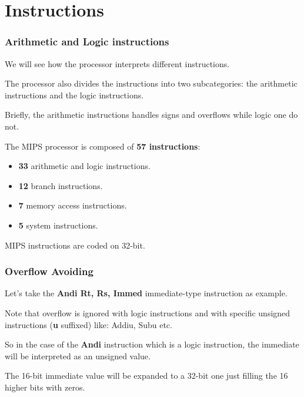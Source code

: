 %
%

\section{Instructions}


\begin{frame}
  \frametitle{Arithmetic and Logic instructions}

  We will see how the processor interprets different instructions.

  \-

  The processor also divides the instructions into two subcategories:
  the arithmetic instructions and the logic instructions.

  \-

  Briefly, the arithmetic instructions handles signs and overflows while logic
  one do not.

  \-

  The MIPS processor is composed of \textbf{57 instructions}:

  \begin{itemize}
    \item
      \textbf{33} arithmetic and logic instructions.
    \item
      \textbf{12} branch instructions.
    \item
      \textbf{7} memory access instructions.
    \item
      \textbf{5} system instructions.
  \end{itemize}

  \-

  MIPS instructions are coded on 32-bit.
\end{frame}


\begin{frame}
  \frametitle{Overflow Avoiding}

  Let's take the \textbf{Andi Rt, Rs, Immed} immediate-type
  instruction as example.

  \-

  Note that overflow is ignored with logic instructions and with
  specific unsigned instructions (\textbf{u} suffixed) like:
  Addiu, Subu etc.

  \-

  So in the case of the \textbf{Andi} instruction which is a logic
  instruction, the immediate will be interpreted as an unsigned value.

  \-

  The 16-bit immediate value will be expanded to a 32-bit one just
  filling the 16 higher bits with zeros.

  \begin{center}
  \end{center}
\end{frame}

